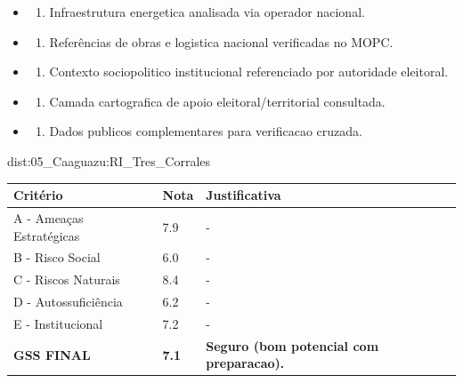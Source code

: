 {\begin{itemize}
\item
  \begin{enumerate}
  \def\labelenumi{\arabic{enumi})}
  \setcounter{enumi}{7}
  \tightlist
  \item
    Infraestrutura energetica analisada via operador nacional.
  \end{enumerate}
\item
  \begin{enumerate}
  \def\labelenumi{\arabic{enumi})}
  \setcounter{enumi}{8}
  \tightlist
  \item
    Referências de obras e logistica nacional verificadas no MOPC.
  \end{enumerate}
\item
  \begin{enumerate}
  \def\labelenumi{\arabic{enumi})}
  \setcounter{enumi}{9}
  \tightlist
  \item
    Contexto sociopolitico institucional referenciado por autoridade
    eleitoral.
  \end{enumerate}
\item
  \begin{enumerate}
  \def\labelenumi{\arabic{enumi})}
  \setcounter{enumi}{10}
  \tightlist
  \item
    Camada cartografica de apoio eleitoral/\allowbreak territorial consultada.
  \end{enumerate}
\item
  \begin{enumerate}
  \def\labelenumi{\arabic{enumi})}
  \setcounter{enumi}{11}
  \tightlist
  \item
    Dados publicos complementares para verificacao cruzada.
  \end{enumerate}
\end{itemize}}{dist:05_Caaguazu:RI_Tres_Corrales}
\begin{table}[ht!]
\small \begin{tabular}{p{3.0cm}p{0.8cm}p{6.0cm}} \toprule
\textbf{Critério} & \textbf{Nota} & \textbf{Justificativa} \\ \midrule
A - Ameaças Estratégicas & 7.9 & - \\
B - Risco Social & 6.0 & - \\
C - Riscos Naturais & 8.4 & - \\
D - Autossuficiência & 6.2 & - \\
E - Institucional & 7.2 & - \\
\midrule \textbf{GSS FINAL} & \textbf{7.1} & \textbf{Seguro (bom potencial com preparacao).} \\ \bottomrule \end{tabular}
\end{table}
